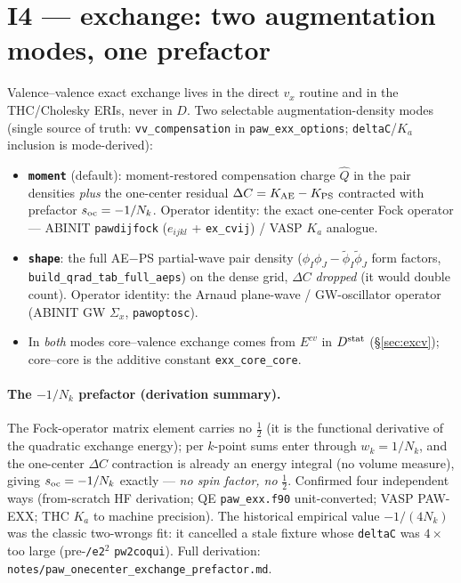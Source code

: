 \documentclass[11pt]{article}
\newcommand{\code}[1]{\texttt{#1}}
\newcommand{\file}[1]{\texttt{#1}}
\newcommand{\Dstat}{D^{\rm stat}}
\newcommand{\Qhat}{\hat{Q}}
\newcommand{\phit}{\tilde\phi}
\begin{document}
\section{I4 --- exchange: two augmentation modes, one prefactor}
\label{sec:exchange}

Valence--valence exact exchange lives in the direct $v_x$ routine and in
the THC/Cholesky ERIs, never in $D$. Two selectable augmentation-density
modes (single source of truth: \code{vv\_compensation} in
\code{paw\_exx\_options}; \code{deltaC}/$K_a$ inclusion is mode-derived):

\begin{keybox}
\begin{itemize}[leftmargin=1.6em]
\item \textbf{\code{moment}} (default): moment-restored compensation charge
$\Qhat$ in the pair densities \emph{plus} the one-center residual
$\Delta C = K_{\rm AE}-K_{\rm PS}$ contracted with prefactor
$s_{\rm oc}=-1/N_k$. Operator identity: the exact one-center Fock operator
--- ABINIT \code{pawdijfock} ($e_{ijkl}$ + \code{ex\_cvij}) / VASP $K_a$
analogue.
\item \textbf{\code{shape}}: the full AE$-$PS partial-wave pair density
($\phi_I\phi_J-\phit_I\phit_J$ form factors,
\code{build\_qrad\_tab\_full\_aeps}) on the dense grid, $\Delta C$
\emph{dropped} (it would double count). Operator identity: the Arnaud
plane-wave / GW-oscillator operator (ABINIT GW $\Sigma_x$,
\code{pawoptosc}).
\item In \emph{both} modes core--valence exchange comes from $E^{cv}$ in
$\Dstat$ (\S\ref{sec:excv}); core--core is the additive constant
\code{exx\_core\_core}.
\end{itemize}
\end{keybox}

\paragraph{The $-1/N_k$ prefactor (derivation summary).} The Fock-operator
matrix element carries no $\tfrac12$ (it is the functional derivative of
the quadratic exchange energy); per $k$-point sums enter through
$w_k=1/N_k$, and the one-center $\Delta C$ contraction is already an energy
integral (no volume measure), giving $s_{\rm oc}=-1/N_k$ exactly ---
\emph{no spin factor, no} $\tfrac12$. Confirmed four independent ways
(from-scratch HF derivation; QE \code{paw\_exx.f90} unit-converted; VASP
PAW-EXX; THC $K_a$ to machine precision). The historical empirical value
$-1/(4N_k)$ was the classic two-wrongs fit: it cancelled a stale fixture
whose \code{deltaC} was $4\times$ too large (pre-\code{/e2$^2$}
\code{pw2coqui}). Full derivation:
\file{notes/paw\_onecenter\_exchange\_prefactor.md}.
\end{document}
